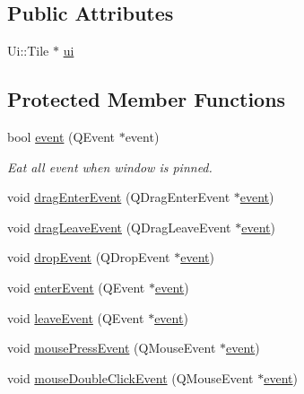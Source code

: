 \subsection*{Public Attributes}
\begin{DoxyCompactItemize}
\item 
Ui\+::\+Tile $\ast$ \hyperlink{classTile_af9b10613aac7f5cbffac5ff7d17937d7}{ui}
\end{DoxyCompactItemize}
\subsection*{Protected Member Functions}
\begin{DoxyCompactItemize}
\item 
bool \hyperlink{classTile_afe7e8c10c6bc2f5dabdfb26bc5b8f170}{event} (Q\+Event $\ast$event)
\begin{DoxyCompactList}\small\item\em Eat all event when window is pinned. \end{DoxyCompactList}\item 
void \hyperlink{classTile_af633e057428b3ed6d70380202906f2da}{drag\+Enter\+Event} (Q\+Drag\+Enter\+Event $\ast$\hyperlink{classTile_afe7e8c10c6bc2f5dabdfb26bc5b8f170}{event})
\item 
void \hyperlink{classTile_a5cdcd6c44b1b885731e63767cacc18d9}{drag\+Leave\+Event} (Q\+Drag\+Leave\+Event $\ast$\hyperlink{classTile_afe7e8c10c6bc2f5dabdfb26bc5b8f170}{event})
\item 
void \hyperlink{classTile_a4b1d24e35991d2215b72df9203643272}{drop\+Event} (Q\+Drop\+Event $\ast$\hyperlink{classTile_afe7e8c10c6bc2f5dabdfb26bc5b8f170}{event})
\item 
void \hyperlink{classTile_a980bff59aaa43eb6d02efc12c2141fd3}{enter\+Event} (Q\+Event $\ast$\hyperlink{classTile_afe7e8c10c6bc2f5dabdfb26bc5b8f170}{event})
\item 
void \hyperlink{classTile_a162f26a310fa98772744c54b838b2801}{leave\+Event} (Q\+Event $\ast$\hyperlink{classTile_afe7e8c10c6bc2f5dabdfb26bc5b8f170}{event})
\item 
void \hyperlink{classTile_ac60074ff290103f2e26c514e2dbc8a40}{mouse\+Press\+Event} (Q\+Mouse\+Event $\ast$\hyperlink{classTile_afe7e8c10c6bc2f5dabdfb26bc5b8f170}{event})
\item 
void \hyperlink{classTile_abdcd52e56f2aa88e1c2580c09a0e35d0}{mouse\+Double\+Click\+Event} (Q\+Mouse\+Event $\ast$\hyperlink{classTile_afe7e8c10c6bc2f5dabdfb26bc5b8f170}{event})
\end{DoxyCompactItemize}
